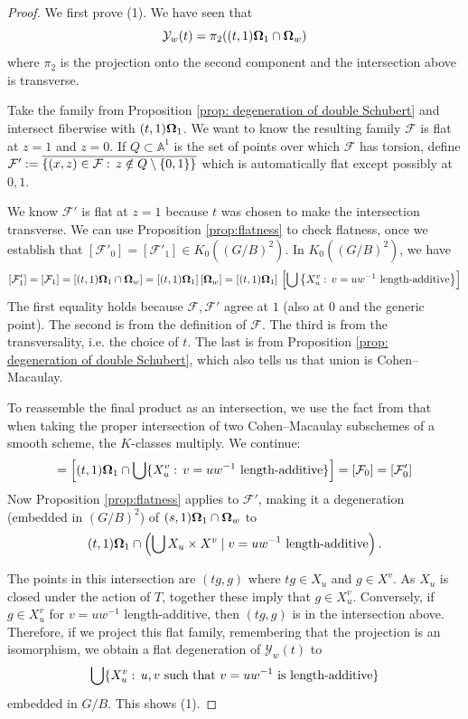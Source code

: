 \documentclass[11pt]{amsart}
\theoremstyle{definition}
\newcommand\bOm{{\bf \Omega}}
\def\AA{{\mathbb A }}
\newcommand\Union\bigcup
\newcommand\calY{{\mathcal Y}}
\newcommand\calF{{\mathcal F}}
\renewcommand\AA{{\mathbb A}}
\renewcommand{\colon}{\mathrel{:}}
\renewcommand{\colon}{:\mkern\thinmuskip}
\begin{document}
\begin{proof}
  We first prove (1). We have seen that
  \[ \calY_w(t) = \pi_2((t , 1) \bOm_1 \cap \bOm_w)
  \]
  where $\pi_2$ is the projection onto the second component and the
  intersection above is transverse.

  Take the family from Proposition \ref{prop: degeneration of double Schubert}
  and intersect fiberwise with $(t,1)\bOm_1$. We want to know the resulting
  family $\calF$ is flat at $z=1$ and $z=0$. If $Q \subset \AA^1$ is
  the set of points over which $\calF$ has torsion, define
  $\calF' := \overline{ \{(x,z) \in \calF\colon z \notin Q\setminus\{0,1\} \}}$
  which is automatically flat except possibly at $0,1$.
 
  We know $\calF'$ is flat at $z=1$ because $t$ was chosen to make the
  intersection transverse. 
  We can use Proposition \ref{prop:flatness} to check flatness,
  once we establish that $[\calF'_0] = [\calF'_1] \in K_0((G/B)^2)$. In $K_0((G/B)^2)$, we have
  \[
    [\calF'_1]
    = [\calF_1] 
    = [(t,1)\bOm_1 \cap \bOm_w] 
    = [(t,1)\bOm_1] \, [\bOm_w] 
    = [(t,1)\bOm_1] \, \left[
      \Union \left\{ X_{u}^v \colon v= uw^{-1}\text{ length-additive} \right\} \right]
  \]
  The first equality holds because $\calF,\calF'$ agree at $1$
  (also at $0$ and the generic point).
  The second is from the definition of $\calF$.
  The third is from the transversality, i.e. the choice of $t$. 
  The last is from Proposition \ref{prop: degeneration of double Schubert},
  which also tells us that union is Cohen--Macaulay. 

  To reassemble the final product as an intersection, we use the fact
  from \cite[proof of Proposition 7.1]{fulton2013intersection}
  that when taking the proper intersection %
  of two Cohen--Macaulay subschemes of a smooth scheme, the $K$-classes multiply.
  We continue:
  \[ = \left[ (t,1)\bOm_1 \cap
      \bigcup \{ X_{u}^v \colon v= uw^{-1}\text{ length-additive} \}
    \right]
    = [\calF_0] = [\calF'_0]
  \]
  Now Proposition \ref{prop:flatness} applies to $\calF'$, making it a
  degeneration (embedded in $(G/B)^2$) of $(s,1)\bOm_1 \cap \bOm_w$ to
  \begin{align*}
    (t , 1) \bOm_1 \cap \left ( \bigcup X_u \times X^v \; \lvert \; v = uw^{-1} \text{ length-additive} \right ). 
  \end{align*}
  
  The points in this intersection are $(tg,g)$ where $tg \in X_u$ and
  $g \in X^v$. As $X_u$ is closed under the action of $T$, 
  together these imply that $g \in X_u^v$. Conversely, if
  $g \in X_u^v$ for $v=uw^{-1}$ length-additive, then $(tg,g)$ is in
  the intersection above. Therefore, if we project this flat family,
  remembering that the projection is an isomorphism, we obtain a flat
  degeneration of $\calY_w(t)$ to
  \[\Union \{ X_{u}^v\colon u,v\text{ such that }v= uw^{-1}\text{ is length-additive} \} \]
  embedded in $G/B$.
  This shows (1).
  

\end{proof}
\end{document}
